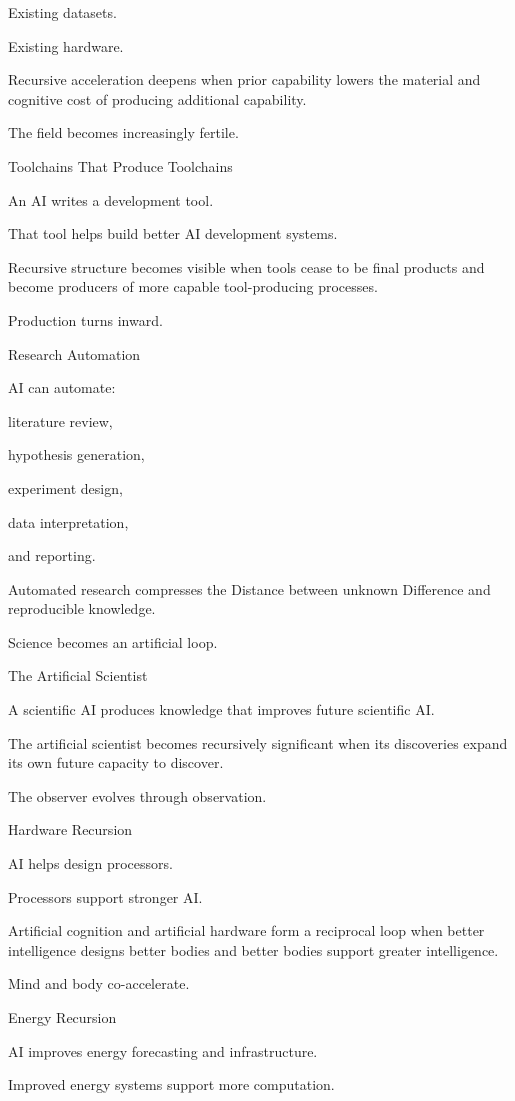Existing datasets.

Existing hardware.

Recursive acceleration deepens when prior capability lowers the material and cognitive cost of producing additional capability.

The field becomes increasingly fertile.

Toolchains That Produce Toolchains

An AI writes a development tool.

That tool helps build better AI development systems.

Recursive structure becomes visible when tools cease to be final products and become producers of more capable tool-producing processes.

Production turns inward.

Research Automation

AI can automate:

literature review,

hypothesis generation,

experiment design,

data interpretation,

and reporting.

Automated research compresses the Distance between unknown Difference and reproducible knowledge.

Science becomes an artificial loop.

The Artificial Scientist

A scientific AI produces knowledge that improves future scientific AI.

The artificial scientist becomes recursively significant when its discoveries expand its own future capacity to discover.

The observer evolves through observation.

Hardware Recursion

AI helps design processors.

Processors support stronger AI.

Artificial cognition and artificial hardware form a reciprocal loop when better intelligence designs better bodies and better bodies support greater intelligence.

Mind and body co-accelerate.

Energy Recursion

AI improves energy forecasting and infrastructure.

Improved energy systems support more computation.

